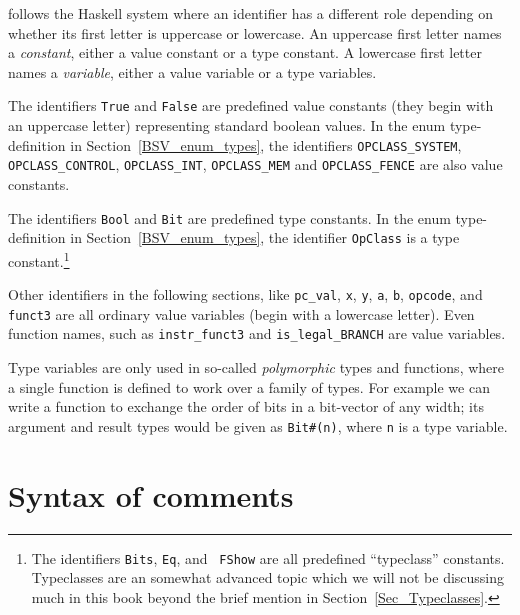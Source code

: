 {\BSV} follows the Haskell system where an identifier has a different
role depending on whether its first letter is uppercase or lowercase.
An uppercase first letter names a \emph{constant}, either a value
constant or a type constant.  A lowercase first letter names a
\emph{variable}, either a value variable or a type variables.


The identifiers \verb|True| and \verb|False| are predefined value
constants (they begin with an uppercase letter) representing standard
boolean values.  In the enum type-definition in
Section~\ref{BSV_enum_types}, the identifiers \verb|OPCLASS_SYSTEM|,
\verb|OPCLASS_CONTROL|, \verb|OPCLASS_INT|, \verb|OPCLASS_MEM| and
\verb|OPCLASS_FENCE| are also value constants.

The identifiers \verb|Bool| and \verb|Bit| are predefined type
constants.  In the enum type-definition in
Section~\ref{BSV_enum_types}, the identifier \verb|OpClass| is a type
constant.\footnote{The identifiers {\tt Bits}, {\tt Eq}, and {\tt
FShow} are all predefined ``typeclass'' constants.  Typeclasses are an
somewhat advanced topic which we will not be discussing much in this
book beyond the brief mention in Section~\ref{Sec_Typeclasses}.  }

Other identifiers in the following sections, like \verb|pc_val|,
\verb|x|, \verb|y|, \verb|a|, \verb|b|, \verb|opcode|, and
\verb|funct3| are all ordinary value variables (begin with a lowercase
letter).  Even function names, such as \verb|instr_funct3| and
\verb|is_legal_BRANCH| are value variables.

Type variables are only used in so-called \emph{polymorphic} types and
functions, where a single function is defined to work over a family of
types.  For example we can write a function to exchange the order of
bits in a bit-vector of any width; its argument and result types would
be given as \verb|Bit#(n)|, where \verb|n| is a type variable.


\section{Syntax of comments}

\label{BSV_Syntax_of_comments}


